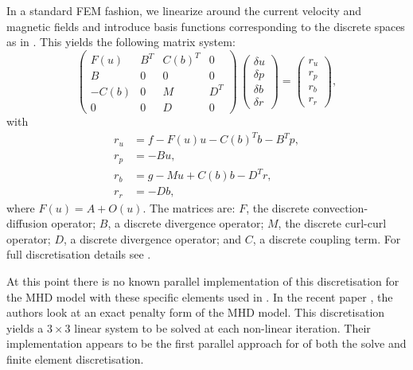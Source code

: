 \documentclass[11pt]{article}
\begin{document}
In a standard FEM fashion, we linearize around the current velocity and magnetic fields and introduce basis functions corresponding to the discrete spaces as in \cite{schotzau2004mixed}. This yields the following matrix system:
\begin{equation}
\label{eq:mhd_saddle}
\left(
\begin{array}{cccc}
F(u) & B^T & C(b)^T & 0\\
B & 0 & 0 & 0 \\
-C(b) & 0 & M & D^T\\
0 & 0 & D & 0
\end{array}
\right)
\,
\left(
\begin{array}{c}
\delta u\\
\delta p\\
\delta b\\
\delta r
\end{array}
\right)  =
\begin{pmatrix}
r_u \\
r_p\\
r_b\\
r_r
\end{pmatrix},
\end{equation}
with
\begin{equation} \nonumber
\begin{array}{rl}
r_u &= f- F(u) u - C(b)^T b- B^T p,\\
r_p &=-B u,\\
r_b &=g-Mu+C(b)b-D^T r,\\
r_r &=-D b,
\end{array}
\end{equation}
where $F(u) = A+O(u)$. The matrices are: ${F}$, the discrete convection-diffusion operator; ${B}$, a discrete divergence operator; ${M}$, the discrete curl-curl operator; ${D}$, a discrete divergence operator; and ${C}$, a discrete coupling term. For full discretisation details see \cite[Chapter 2]{mythesis}.

At this point there is no known parallel implementation of this discretisation for the MHD model with these specific elements used in \cite{schotzau2004mixed}. In the recent paper \cite{phillips2014block}, the authors look at an exact penalty form of the MHD model. This discretisation yields a $3\times3$ linear system to be solved at each non-linear iteration. Their implementation appears to be the first parallel approach for of both the solve and finite element discretisation.
\end{document}
